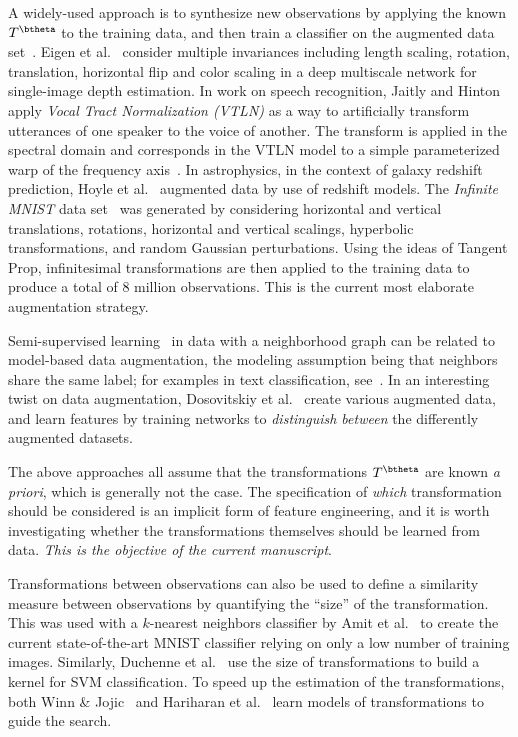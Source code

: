\documentclass[twoside]{article}
\begin{document}
  A widely-used approach is to synthesize new observations by applying
  the known $T^{\btheta}$ to the training data, and then train a classifier on
  the augmented data set~\cite{baird1992document,simard2003best,HintonImageNet2012,loosli:lskm:2007}.
  Eigen et al.~\cite{NIPS2014_5539} consider multiple invariances including length scaling,
  rotation, translation, horizontal flip and color scaling in a deep multiscale network
  for single-image depth estimation. In work on speech recognition, Jaitly and Hinton~\cite{jaitly2013vocal} apply
  \emph{Vocal Tract Normalization (VTLN)}
  as a way to artificially transform utterances of one speaker to the voice of another.
  The transform is applied in the spectral domain and corresponds
  in the VTLN model to a simple parameterized warp of the frequency axis~\cite{jaitly2013vocal}.
  In astrophysics, in the context of galaxy redshift prediction, Hoyle et al.~\cite{Hoyle:2015ada}
  augmented data by use of redshift models.
  The \emph{Infinite MNIST} data set~\cite{loosli:lskm:2007}
  was 
  generated by considering horizontal and vertical translations, rotations,
  horizontal and vertical scalings, hyperbolic transformations, and random Gaussian
  perturbations. Using the ideas
  of Tangent Prop, infinitesimal transformations are then applied to the training
  data to produce a total of 8 million observations. This is the current most elaborate
  augmentation strategy.
  
  Semi-supervised learning~\cite{chapelle2006semi} in data with a neighborhood
  graph can be related to model-based data augmentation,
  the modeling assumption
  being that neighbors share the same label; for examples in text classification, see~\cite{lu2006enhancing}. 
  In an interesting twist on data augmentation, Dosovitskiy et al.~\cite{dosovitskiy2013unsupervised}
  create various augmented data, and learn features by training networks to
  \emph{distinguish between} the differently augmented datasets.

  The above approaches all assume that the transformations $T^{\btheta}$ are known \emph{a priori},
  which is generally not the case. The specification of \emph{which} transformation
  should be considered is an implicit form of feature engineering, and it is worth
  investigating whether the transformations themselves should be learned from data.
  \emph{This is the objective of the current manuscript}.
  
  Transformations between observations can also be used to define a similarity
  measure between observations by quantifying the ``size'' of the transformation.
  This was used with a $k$-nearest neighbors classifier by Amit et al.~\cite{Amit:ijcv:2007}
  to create the current state-of-the-art MNIST classifier relying on only a low
  number of training images. Similarly, Duchenne et al.~\cite{duchenne2011graph}
  use the size of transformations to build a kernel for SVM classification.
  To speed up the estimation of the transformations, both Winn \& Jojic~\cite{winn2005locus}
  and Hariharan et al.~\cite{hariharan2014detecting} learn models of transformations to guide the search.
  
\end{document}

